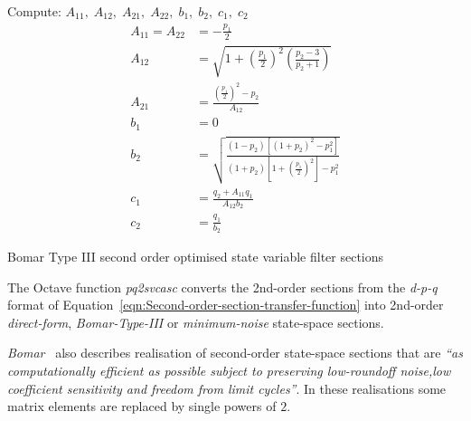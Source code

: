 \documentclass[a4paper,twoside,10pt,english]{report}
\begin{document}
\begin{algorithm}[!htpb]
Compute: $A_{11},\;A_{12},\;A_{21},\;A_{22},\;b_{1},\;b_{2},\;c_{1},\;c_{2}$
\begin{align*}
A_{11} = A_{22} &= -\frac{p_{1}}{2}\\
A_{12} &= \sqrt{1+\left(\frac{p_{1}}{2}\right)^{2}\left(\frac{p_{2}-3}{p_{2}+1}\right)}\\
A_{21} &= \frac{\left(\frac{p_{1}}{2}\right)^{2}-p_{2}}{A_{12}}\\
b_{1} &= 0\\
b_{2} &= \sqrt{
\frac{\left(1-p_{2}\right)\left[\left(1+p_{2}\right)^{2}-p_{1}^{2}\right]}
{\left(1+p_{2}\right)\left[1+\left(\frac{p_{1}}{2}\right)^{2}\right]-p_{1}^{2}}}\\
c_{1} &= \frac{q_{2}+A_{11}q_{1}}{A_{12}b_{2}}\\
c_{2} &= \frac{q_{1}}{b_{2}}
\end{align*}
\caption{Bomar Type III second order optimised state variable filter sections~\cite[Equation 23]{Bomar_NewSecondOrderStateSpaceStructures}}
\label{alg:Bomar-Type-III-optimised-second-order-state-variable-filter-sections}
\end{algorithm}
The Octave function \emph{pq2svcasc}
converts the 2nd-order sections from the \emph{d-p-q} format of 
Equation~\ref{eqn:Second-order-section-transfer-function} into 2nd-order
\emph{direct-form}, \emph{Bomar-Type-III} or \emph{minimum-noise} state-space
sections.

\emph{Bomar}~\cite{Bomar_OnDesignSecondOrderStateSpaceDigitalFilterSections}
also describes realisation of second-order state-space sections that are
\emph{``as computationally efficient as possible subject to preserving
low-roundoff noise,low coefficient sensitivity and freedom from limit cycles''}.
In these realisations some matrix elements are replaced by single powers of $2$.
\end{document}
